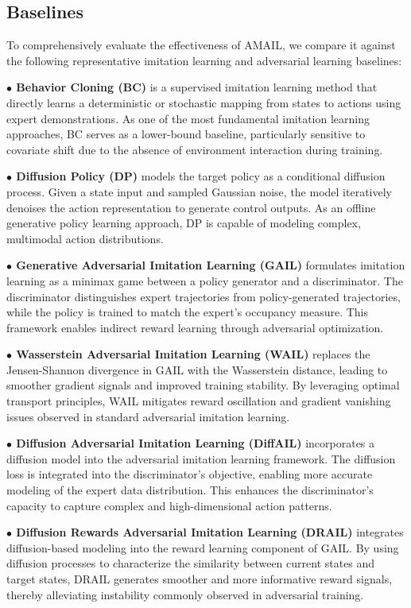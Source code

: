 \documentclass[lettersize,journal]{IEEEtran}
\begin{document}
\subsection{Baselines}
To comprehensively evaluate the effectiveness of AMAIL, we compare it against the following representative imitation learning and adversarial learning baselines:

\textbf{$\bullet$ Behavior Cloning (BC)} is a supervised imitation learning method that directly learns a deterministic or stochastic mapping from states to actions using expert demonstrations. As one of the most fundamental imitation learning approaches, BC serves as a lower-bound baseline, particularly sensitive to covariate shift due to the absence of environment interaction during training.

\textbf{$\bullet$ Diffusion Policy (DP)} models the target policy as a conditional diffusion process. Given a state input and sampled Gaussian noise, the model iteratively denoises the action representation to generate control outputs. As an offline generative policy learning approach, DP is capable of modeling complex, multimodal action distributions.

\textbf{$\bullet$ Generative Adversarial Imitation Learning (GAIL)} formulates imitation learning as a minimax game between a policy generator and a discriminator. The discriminator distinguishes expert trajectories from policy-generated trajectories, while the policy is trained to match the expert's occupancy measure. This framework enables indirect reward learning through adversarial optimization.

\textbf{$\bullet$ Wasserstein Adversarial Imitation Learning (WAIL)} replaces the Jensen-Shannon divergence in GAIL with the Wasserstein distance, leading to smoother gradient signals and improved training stability. By leveraging optimal transport principles, WAIL mitigates reward oscillation and gradient vanishing issues observed in standard adversarial imitation learning.

\textbf{$\bullet$ Diffusion Adversarial Imitation Learning (DiffAIL)} incorporates a diffusion model into the adversarial imitation learning framework. The diffusion loss is integrated into the discriminator's objective, enabling more accurate modeling of the expert data distribution. This enhances the discriminator's capacity to capture complex and high-dimensional action patterns.

\textbf{$\bullet$ Diffusion Rewards Adversarial Imitation Learning (DRAIL)} integrates diffusion-based modeling into the reward learning component of GAIL. By using diffusion processes to characterize the similarity between current states and target states, DRAIL generates smoother and more informative reward signals, thereby alleviating instability commonly observed in adversarial training.
\end{document}
